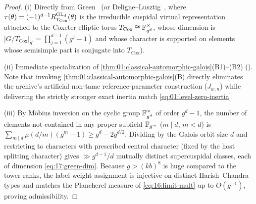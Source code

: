 
\begin{proof}
(i) Directly from Green~\cite[Theorem~14]{Green1955} (or Deligne--Lusztig~\cite{DeligneLusztig1976}, where $\tau(\theta) = (-1)^{d-1} R_{T_{\mathrm{Cox}}}^{\mathrm{GL}_d}(\theta)$ is the irreducible cuspidal virtual representation attached to the Coxeter elliptic torus $T_{\mathrm{Cox}} \cong \mathbb{F}_{g^d}^\times$, whose dimension is $|G/T_{\mathrm{Cox}}|_{g'} = \prod_{j=1}^{d-1}(g^j - 1)$ and whose character is supported on elements whose semisimple part is conjugate into $T_{\mathrm{Cox}}$).

(ii) Immediate specialization of \cref{thm:01:classical-automorphic-galois}(B1)--(B2) (\cite{BushnellHenniart2005,BushnellHenniart2011}). Note that invoking \cref{thm:01:classical-automorphic-galois}(B) directly eliminates the archive's artificial non-tame reference-parameter construction ($J_{w, n}$) while delivering the strictly stronger exact inertia match \eqref{eq:01:level-zero-inertia}.

(iii) By M\"obius inversion on the cyclic group $\mathbb{F}_{g^d}^\times$ of order $g^d - 1$, the number of elements not contained in any proper subfield $\mathbb{F}_{g^m}$ ($m \mid d$, $m < d$) is $\sum_{m \mid d}\mu(d/m)(g^m - 1) \ge g^d - 2 g^{d/2}$. Dividing by the Galois orbit size $d$ and restricting to characters with prescribed central character (fixed by the host splitting character) gives $\gg g^{d-1}/d$ mutually distinct supercuspidal classes, each of dimension \eqref{eq:17:green-dim}. Because $g > (k b)^8$ is huge compared to the tower ranks, the label-weight assignment is injective on distinct Harish--Chandra types and matches the Plancherel measure of \eqref{eq:16:limit-mult} up to $O(g^{-1})$, proving admissibility.
\end{proof}

